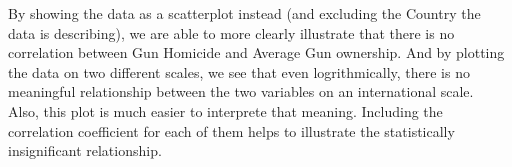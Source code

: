 \documentclass[12pt,letterpaper,final]{article}
\begin{document}
\begin{enumerate}
By showing the data as a scatterplot instead (and excluding the Country the data is describing), we are able to more clearly illustrate that there is no correlation between Gun Homicide and Average Gun ownership.  And by plotting the data on two different scales, we see that even logrithmically, there is no meaningful relationship between the two variables on an international scale.\\ 

Also, this plot is much easier to interprete that meaning.  Including the correlation coefficient for each of them helps to illustrate the statistically insignificant relationship.
\end{enumerate}


\newpage


~\\
\end{document}
